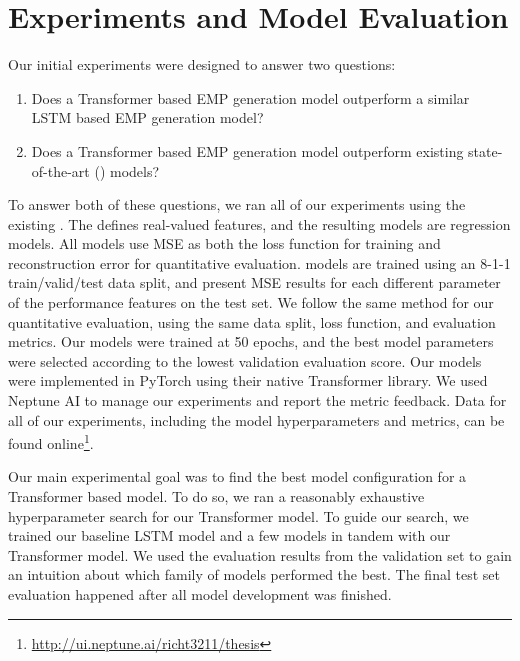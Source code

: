 \section{Experiments and Model Evaluation}\label{sec:experiments-and-evaluation}
Our initial experiments were designed to answer two questions: 
\begin{enumerate}
    \item Does a Transformer based EMP generation model outperform a similar LSTM based EMP generation model?
    \item Does a Transformer based EMP generation model outperform existing state-of-the-art (\vnet{}) models?
\end{enumerate}
To answer both of these questions, we ran all of our experiments using the existing \vnetf{}. The \vnetf{} defines real-valued features, and the resulting models are regression models. All \vnet{} models use MSE as both the loss function for training and reconstruction error for quantitative evaluation. \vnet{} models are trained using an 8-1-1 train/valid/test data split, and \citet{jeong2019virtuosonet} present MSE results for each different parameter of the performance features on the test set. We follow the same method for our quantitative evaluation, using the same data split, loss function, and evaluation metrics. Our models were trained at 50 epochs, and the best model parameters were selected according to the lowest validation evaluation score. Our models were implemented in PyTorch using their native Transformer library. We used Neptune AI \cite{neptune} to manage our experiments and report the metric feedback. Data for all of our experiments, including the model hyperparameters and metrics, can be found online\footnote{\url{http://ui.neptune.ai/richt3211/thesis}}. 

Our main experimental goal was to find the best model configuration for a Transformer based model. To do so, we ran a reasonably exhaustive hyperparameter search for our Transformer model. To guide our search, we trained our baseline LSTM model and a few \vnet{} models in tandem with our Transformer model. We used the evaluation results from the validation set to gain an intuition about which family of models performed the best. The final test set evaluation happened after all model development was finished. 

